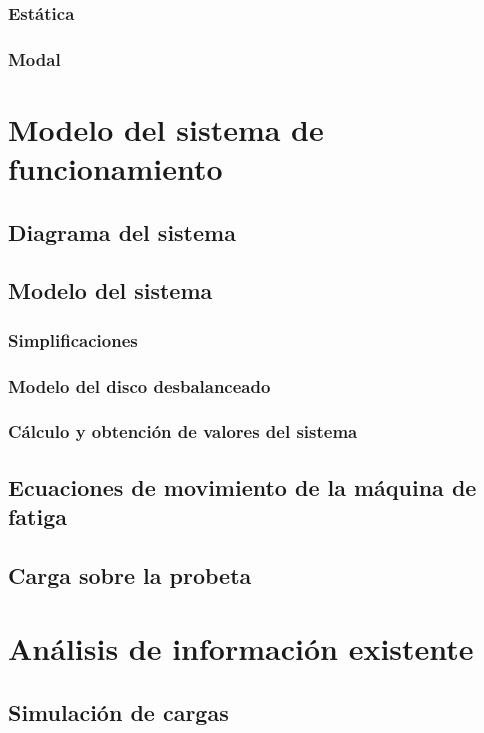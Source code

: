 \subsubsection{Estática}
\subsubsection{Modal}


\section{Modelo del sistema de funcionamiento}
\subsection{Diagrama del sistema}

\subsection{Modelo del sistema}
\subsubsection{Simplificaciones}
\subsubsection{Modelo del disco desbalanceado}
\subsubsection{Cálculo y obtención de valores del sistema}

\subsection{Ecuaciones de movimiento de la máquina de fatiga}

\subsection{Carga sobre la probeta}

\section{Análisis de información existente}
\subsection{Simulación de cargas}